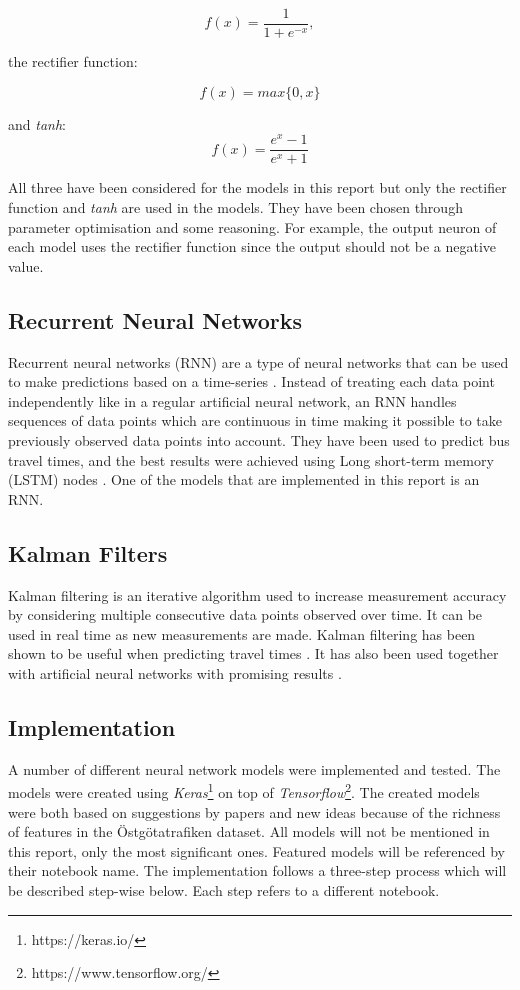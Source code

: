 \begin{equation} 
    f(x) = \frac{1}{1+e^{-x}},
\end{equation}

the rectifier function:

\begin{equation} 
    f(x) = max\{0,x\}
\end{equation}

and \textit{tanh}:
\begin{equation} 
    f(x) =  \frac{e^x-1}{e^{x}+1} 
\end{equation}

All three have been considered for the models in this report but only the rectifier function and \textit{tanh} are used in the models. They have been chosen through parameter optimisation and some reasoning. For example, the output neuron of each model uses the rectifier function since the output should not be a negative value.

\subsection{Recurrent Neural Networks}
Recurrent neural networks (RNN) are a type of neural networks that can be used to make predictions based on a time-series \cite{RNN}. Instead of treating each data point independently like in a regular artificial neural network, an RNN handles sequences of data points which are continuous in time making it possible to take previously observed data points into account. They have been used to predict bus travel times, and the best results were achieved using Long short-term memory (LSTM) nodes \cite{RNNBusPredictions}. One of the models that are implemented in this report is an RNN. 

\subsection{Kalman Filters}
Kalman filtering is an iterative algorithm used to increase measurement accuracy by considering multiple consecutive data points observed over time. It can be used in real time as new measurements are made. Kalman filtering has been shown to be useful when predicting travel times \cite{kalmanPrediction, brazilANN}. It has also been used together with artificial neural networks with promising results \cite{kalmanANN}.

\subsection{Implementation}
A number of different neural network models were implemented and tested. The models were created using \textit{Keras}\footnote{https://keras.io/} on top of \textit{Tensorflow}\footnote{https://www.tensorflow.org/}. The created models were both based on suggestions by papers and new ideas because of the richness of features in the Östgötatrafiken dataset. All models will not be mentioned in this report, only the most significant ones. Featured models will be referenced by their notebook name. The implementation follows a three-step process which will be described step-wise below. Each step refers to a different notebook.

